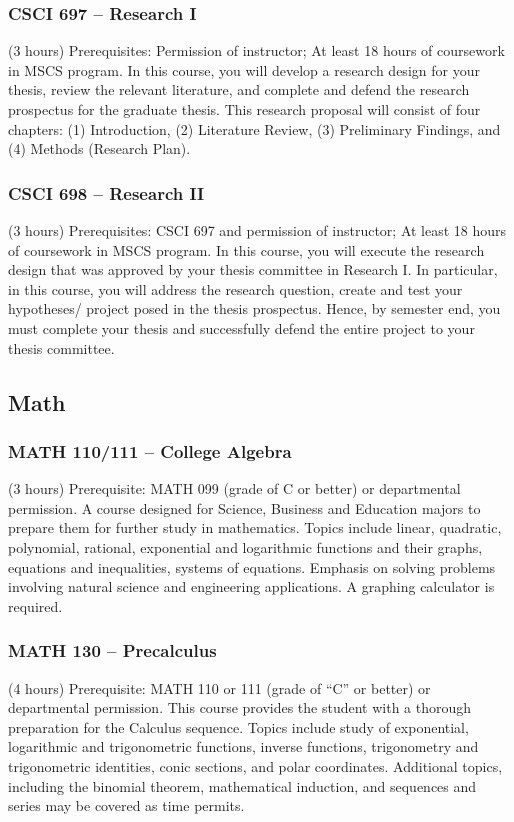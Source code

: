 \subsubsection{CSCI 697 -- Research I}%
\label{course:CSCI:697}
(3 hours) Prerequisites: Permission of instructor; At least 18 hours of coursework in MSCS program.   In this course, you will develop a research design for your thesis, review the relevant literature, and complete and defend the research prospectus for the graduate thesis. This research proposal will consist of four chapters: (1) Introduction, (2) Literature Review, (3) Preliminary Findings, and (4) Methods (Research Plan). 

\subsubsection{CSCI 698 -- Research II}%
\label{course:CSCI:698}
(3 hours) Prerequisites: CSCI 697 and permission of instructor; At least 18 hours of coursework in MSCS program. In this course, you will execute the research design that was approved by your thesis committee in Research I. In particular, in this course, you will address the research question, create and test your hypotheses/ project posed in the thesis prospectus. Hence, by semester end, you must complete your thesis and successfully defend the entire project to your thesis committee. 

\subsection{Math}

\subsubsection{MATH 110/111 -- College Algebra}%
\label{course:MATH:111}
(3 hours) Prerequisite: MATH 099 (grade of C or better) or departmental permission. A course designed for Science, Business and Education majors to prepare them for further study in mathematics. Topics include linear, quadratic, polynomial, rational, exponential and logarithmic functions and their graphs, equations and inequalities, systems of equations. Emphasis on solving problems involving natural science and engineering applications. A graphing calculator is required.

\subsubsection{MATH 130 -- Precalculus}%
\label{course:MATH:130}
(4 hours) Prerequisite: MATH 110 or 111 (grade of “C” or better) or departmental permission. This course provides the student with a thorough preparation for the Calculus sequence. Topics include study of exponential, logarithmic and trigonometric functions, inverse functions, trigonometry and trigonometric identities, conic sections, and polar coordinates. Additional topics, including the binomial theorem, mathematical induction, and sequences and series may be covered as time permits.

